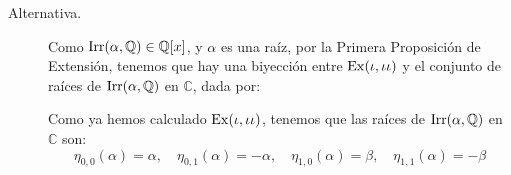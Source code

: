 \begin{ejercicio}
\begin{enumerate}
\begin{description}
                \item[Alternativa.] Como $\operatorname{Irr}(\alpha,\mathbb{Q})\in \mathbb{Q}[x]$, y $\alpha$ es una raíz, por la Primera Proposición de Extensión, tenemos que hay una biyección entre $\operatorname{Ex}(\iota,\iota\iota)$ y el conjunto de raíces de $\operatorname{Irr}(\alpha,\mathbb{Q})$ en $\mathbb{C}$, dada por:
                
                Como ya hemos calculado $\operatorname{Ex}(\iota,\iota\iota)$, tenemos que las raíces de $\operatorname{Irr}(\alpha,\mathbb{Q})$ en $\mathbb{C}$ son:
                \begin{equation*}
                    \eta_{0,0}(\alpha) = \alpha, \quad \eta_{0,1}(\alpha) = -\alpha, \quad \eta_{1,0}(\alpha) = \beta, \quad \eta_{1,1}(\alpha) = -\beta
                \end{equation*}
            \end{description}
    \end{enumerate}
\end{ejercicio}



